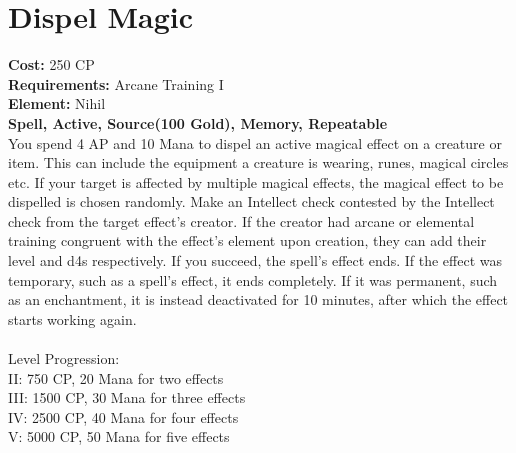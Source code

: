 \section{Dispel Magic}
\textbf{Cost:} 250 CP\\
\textbf{Requirements:} Arcane Training I\\
\textbf{Element:} Nihil\\
\textbf{Spell, Active, Source(100 Gold), Memory, Repeatable}\\
You spend 4 AP and 10 Mana to dispel an active magical effect on a creature or item. This can include the equipment a creature is wearing, runes, magical circles etc. If your target is affected by multiple magical effects, the magical effect to be dispelled is chosen randomly. Make an Intellect check contested by the Intellect check from the target effect's creator. If the creator had arcane or elemental training congruent with the effect's element upon creation, they can add their level and d4s respectively. If you succeed, the spell's effect ends. If the effect was temporary, such as a spell's effect, it ends completely. If it was permanent, such as an enchantment, it is instead deactivated for 10 minutes, after which the effect starts working again.\\
\\
Level Progression:\\
II: 750 CP, 20 Mana for two effects\\
III: 1500 CP, 30 Mana for three effects\\
IV: 2500 CP, 40 Mana for four effects\\
V: 5000 CP, 50 Mana for five effects\\